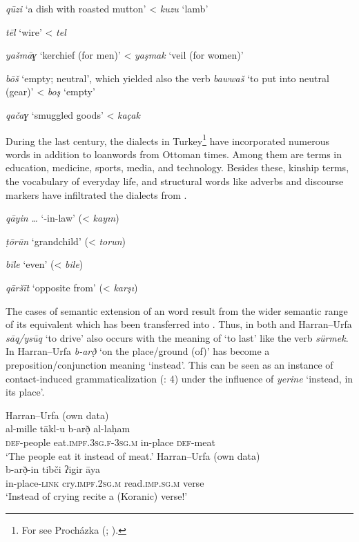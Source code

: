 \documentclass[output=paper]{langsci/langscibook}
\begin{document}
\textit{qūzi} ‘a dish with roasted mutton’ <  \textit{kuzu} ‘lamb’

\textit{tēl} ‘wire’ <  \textit{tel}

\textit{yašmāɣ} ‘kerchief (for men)’ <  \textit{yaşmak} ‘veil (for women)’

\textit{bōš} ‘empty; neutral’, which yielded also the verb \textit{bawwaš} ‘to put into neutral (gear)’ <  \textit{boş} ‘empty’

\textit{qačaɣ} ‘smuggled goods’ <  \textit{kaçak}
\z

During the last century, the  dialects in Turkey\footnote{For  see Procházka (\citeyear{Procházka2002Cukurova}; \citeyear[187--199]{Procházka2002Adana}).} have incorporated numerous  words in addition to {loanwords} from Ottoman times. Among them are terms in education, medicine, sports, media, and technology. Besides these, kinship terms, the vocabulary of everyday life, and structural words like adverbs and discourse markers have infiltrated the dialects from . 

\ea
{} 

\textit{qāyin} \textit{…} ‘-in-law’ (<  \textit{kayın})

\textit{ṭōrūn} ‘grandchild’ (<  \textit{torun})

\textit{bīle} ‘even’ (<  \textit{bile})

\textit{qāršīt} ‘opposite from’ (<  \textit{karşı})
\z

The cases of semantic {extension} of an  word result from the wider semantic range of its  equivalent which has been transferred into . Thus, in both  and Harran--Urfa  \textit{sāq/ysūq} ‘to drive’ also occurs with the meaning of ‘to last’ like the  verb \textit{sürmek}. In Harran--Urfa \textit{b-arð̣} ‘on the place/ground (of)’ has become a {preposition}/conjunction meaning ‘instead’. This can be seen as an instance of {contact-induced grammaticalization} (\citealt{GardaniArkadievAmiridze2015}: 4) under the influence of  \textit{yerine} ‘instead, in its place’.

\ea
{Harran--Urfa (own data)}\\
 \gll   al-mille tākl-u b-arð̣ al-laḥam\\
     \textsc{def}{}-people eat.\textsc{impf.3sg.f-3sg.m}  in-place \textsc{def}{}-meat\\
\glt  ‘The people eat it instead of meat.’
\ex 
{Harran--Urfa (own data)}\\
\gll    b-arð̣-in tibči ʔigir āya\\
     in-place-\textsc{link} cry.\textsc{impf.2sg.m} read.\textsc{imp.sg.m} verse\\
\glt ‘Instead of crying recite a (Koranic) verse!’
\z
\end{document}
